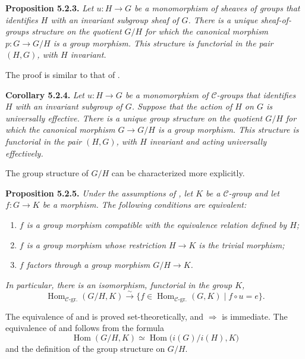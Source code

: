 \medskip
\noindent{}\textbf{Proposition 5.2.3.}
\textit{Let \(u:H\to G\) be a monomorphism of sheaves of groups that
identifies \(H\) with an invariant subgroup sheaf of \(G\). There is a
unique sheaf-of-groups structure on the quotient \(G/H\) for which
the canonical morphism \(p:G\to G/H\) is a group morphism. This structure
is functorial in the pair \((H,G)\), with \(H\) invariant.}

The proof is similar to that of .

\medskip
\noindent{}\textbf{Corollary 5.2.4.}
\textit{Let \(u:H\to G\) be a monomorphism of \(\mathscr C\)-groups that
identifies \(H\) with an invariant subgroup of \(G\). Suppose that the
action of \(H\) on \(G\) is universally effective. There is a unique group
structure on the quotient \(G/H\) for
which the canonical morphism \(G\to G/H\) is a group morphism. This
structure is functorial in the pair \((H,G)\), with \(H\) invariant and
acting universally effectively.}

The group structure of \(G/H\) can be characterized more explicitly.

\medskip
\noindent{}\textbf{Proposition 5.2.5.}
\textit{Under the assumptions of , let \(K\) be a
\(\mathscr C\)-group and let \(f:G\to K\) be a morphism. The following
conditions are equivalent:}
\begin{enumerate}
  \item[(i)] \textit{\(f\) is a group morphism compatible with the
  equivalence relation defined by \(H\);}
  \item[(ii)] \textit{\(f\) is a group morphism whose restriction
  \(H\to K\) is the trivial morphism;}
  \item[(iii)] \textit{\(f\) factors through a group morphism
  \(G/H\to K\).}
\end{enumerate}
\textit{In particular, there is an isomorphism, functorial in the group
\(K\),}
\[
  \operatorname{Hom}_{\mathscr C\text{-gr.}}(G/H,K)
  \xrightarrow{\sim}
  \bigl\{f\in\operatorname{Hom}_{\mathscr C\text{-gr.}}(G,K)
  \mid f\circ u=e\bigr\}.
\]

The equivalence of  and  is proved set-theoretically, and
\(\Rightarrow\) is immediate. The equivalence of  and 
follows from the formula
\[
  \operatorname{Hom}(G/H,K)
  \simeq \operatorname{Hom}\bigl(i(G)/i(H),K\bigr)
\]
and the definition of the group structure on \(G/H\).

